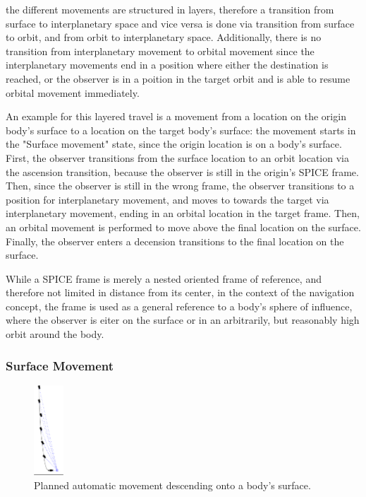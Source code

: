 the different movements are structured in layers, therefore a transition from surface to interplanetary space and
vice versa is done via transition from surface to orbit, and from orbit to interplanetary space.
Additionally, there is no transition from interplanetary movement to orbital movement since the interplanetary
movements end in a position where either the destination is reached, or the observer is in a poition in the target
orbit and is able to resume orbital movement immediately.

An example for this layered travel is a movement from a location on the origin body's surface to a location on the
target body's surface:
the movement starts in the "Surface movement" state, since the origin location is on a body's surface.
First, the observer transitions from the surface location to an orbit location via the ascension transition, because
the observer is still in the origin's SPICE frame.
Then, since the observer is still in the wrong frame, the observer transitions to a position for interplanetary
movement, and moves to towards the target via interplanetary movement, ending in an orbital location in the target
frame.
Then, an orbital movement is performed to move above the final location on the surface.
Finally, the observer enters a decension transitions to the final location on the surface.

While a SPICE frame is merely a nested oriented frame of reference, and therefore not limited in distance from its
center, in the context of the navigation concept, the frame is used as a general reference to a body's sphere of
influence, where the observer is eiter on the surface or in an arbitrarily, but reasonably high orbit around the body.

\subsubsection{Surface Movement}\label{subsubsec:surface-movements}

\begin{figure}
    \centering
    \includegraphics[width=0.1\textwidth]{content/4_3_autoNavigation/img/PlannedLanding}
    \caption{Planned automatic movement descending onto a body's surface.}
    \label{fig:new-auto-nav-descend}
\end{figure}

